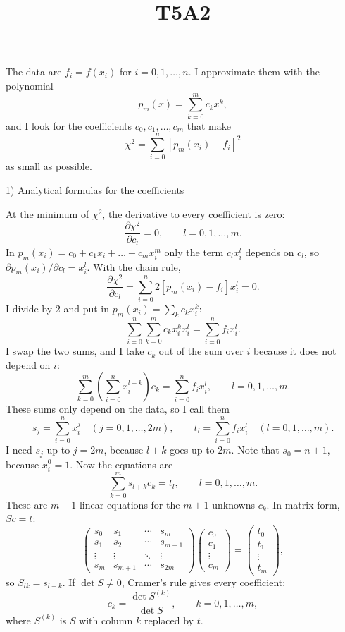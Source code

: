 \documentclass[11pt]{article}
\title{T5A2}
\author{}
\date{}
\begin{document}
\maketitle

The data are $f_i = f(x_i)$ for $i = 0, 1, \dots, n$. I approximate them with the polynomial
\[
p_m(x) = \sum_{k=0}^{m} c_k x^k,
\]
and I look for the coefficients $c_0, c_1, \dots, c_m$ that make
\[
\chi^2 = \sum_{i=0}^{n} [p_m(x_i) - f_i]^2
\]
as small as possible.

1) Analytical formulas for the coefficients

At the minimum of $\chi^2$, the derivative to every coefficient is zero:
\[
\frac{\partial \chi^2}{\partial c_l} = 0, \qquad l = 0, 1, \dots, m.
\]
In $p_m(x_i) = c_0 + c_1 x_i + \dots + c_m x_i^m$ only the term $c_l x_i^l$ depends on $c_l$, so $\partial p_m(x_i)/\partial c_l = x_i^l$. With the chain rule,
\[
\frac{\partial \chi^2}{\partial c_l} = \sum_{i=0}^{n} 2[p_m(x_i) - f_i] x_i^l = 0.
\]
I divide by 2 and put in $p_m(x_i) = \sum_k c_k x_i^k$:
\[
\sum_{i=0}^{n} \sum_{k=0}^{m} c_k x_i^{k} x_i^{l} = \sum_{i=0}^{n} f_i x_i^l.
\]
I swap the two sums, and I take $c_k$ out of the sum over $i$ because it does not depend on $i$:
\[
\sum_{k=0}^{m} \left(\sum_{i=0}^{n} x_i^{l+k}\right) c_k = \sum_{i=0}^{n} f_i x_i^l, \qquad l = 0, 1, \dots, m.
\]
These sums only depend on the data, so I call them
\[
s_j = \sum_{i=0}^{n} x_i^{j} \quad (j = 0, 1, \dots, 2m), \qquad t_l = \sum_{i=0}^{n} f_i x_i^{l} \quad (l = 0, 1, \dots, m).
\]
I need $s_j$ up to $j = 2m$, because $l + k$ goes up to $2m$. Note that $s_0 = n+1$, because $x_i^0 = 1$. Now the equations are
\[
\sum_{k=0}^{m} s_{l+k} c_k = t_l, \qquad l = 0, 1, \dots, m.
\]
These are $m+1$ linear equations for the $m+1$ unknowns $c_k$. In matrix form, $S c = t$:
\[
\begin{pmatrix}
s_0 & s_1 & \cdots & s_m \\
s_1 & s_2 & \cdots & s_{m+1} \\
\vdots & \vdots & \ddots & \vdots \\
s_m & s_{m+1} & \cdots & s_{2m}
\end{pmatrix}
\begin{pmatrix} c_0 \\ c_1 \\ \vdots \\ c_m \end{pmatrix}
=
\begin{pmatrix} t_0 \\ t_1 \\ \vdots \\ t_m \end{pmatrix},
\]
so $S_{lk} = s_{l+k}$. If $\det S \neq 0$, Cramer's rule gives every coefficient:
\[
c_k = \frac{\det S^{(k)}}{\det S}, \qquad k = 0, 1, \dots, m,
\]
where $S^{(k)}$ is $S$ with column $k$ replaced by $t$.
\end{document}
